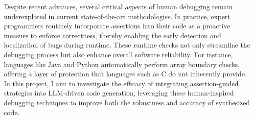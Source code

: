 Despite recent advances, several critical aspects of human debugging remain underexplored in current state-of-the-art methodologies. In practice, expert programmers routinely incorporate assertions into their code as a proactive measure to enforce correctness, thereby enabling the early detection and localization of bugs during runtime. These runtime checks not only streamline the debugging process but also enhance overall software reliability. For instance, languages like Java and Python automatically perform array boundary checks, offering a layer of protection that languages such as C do not inherently provide. In this project, I aim to investigate the efficacy of integrating assertion-guided strategies into LLM-driven code generation, leveraging these human-inspired debugging techniques to improve both the robustness and accuracy of synthesized code.







